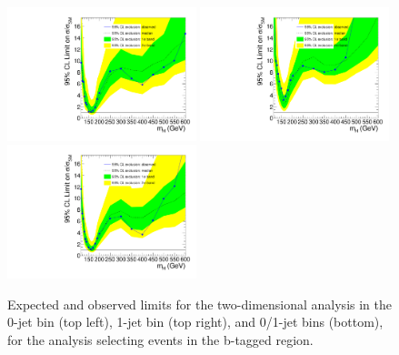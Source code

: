 \begin{figure}[hbt!]
\begin{center}
  \includegraphics[width=0.49\textwidth]{figures/limits8TeV_ofshape0_HCP_2D_BTAG.pdf}
  \includegraphics[width=0.49\textwidth]{figures/limits8TeV_ofshape1_HCP_2D_BTAG.pdf}
  \includegraphics[width=0.49\textwidth]{figures/limits8TeV_ofshape_HCP_2D_BTAG.pdf}
\caption{\label{fig:limits8TeV_ofshapeN_HCP_2D_BTAG}\protect Expected and observed limits for the two-dimensional 
analysis in the 0-jet bin (top left), 1-jet bin (top right), and 0/1-jet bins (bottom), for 
the analysis selecting events in the b-tagged region.}
\end{center}
\end{figure}

